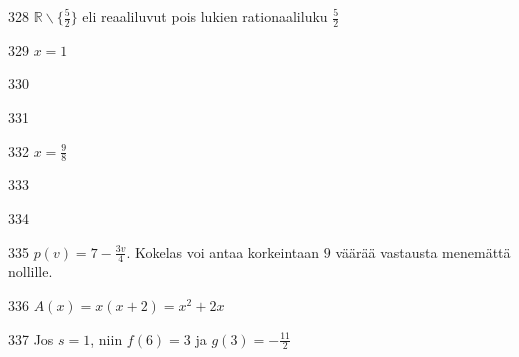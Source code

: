 \begin{Vastaus}{328}
   $\mathbb{R} \backslash \lbrace \frac{5}{2} \rbrace$ eli reaaliluvut pois lukien rationaaliluku $\frac{5}{2}$
  
\end{Vastaus}
\begin{Vastaus}{329}
    $x=1$
    
\end{Vastaus}
\begin{Vastaus}{330}
	 
\end{Vastaus}
\begin{Vastaus}{331}
  
\end{Vastaus}
\begin{Vastaus}{332}
$x=\frac{9}{8}$
  
\end{Vastaus}
\begin{Vastaus}{333}
  
\end{Vastaus}
\begin{Vastaus}{334}
	\alakohdatm{
	§ $\mathbb{R}$
	§ $\mathbb{R}$ $\setminus \lbrace 0 \rbrace$
	§ $\mathbb{R}_+$ (tai $\mathbb{R}_{\geq 0}$ tai $[0, \infty [$)
	§ $\mathbb{R}$
	}
	
\end{Vastaus}
\begin{Vastaus}{335}
		$p(v) = 7-\frac{3v}{4}$. Kokelas voi antaa korkeintaan $9$ väärää vastausta menemättä nollille.
	
\end{Vastaus}
\begin{Vastaus}{336}
    $A(x) = x(x+2)=x^2+2x$
  
\end{Vastaus}
\begin{Vastaus}{337}
   Jos $s=1$, niin $f(6) = 3$ ja $g(3) = -\frac{11}{2}$
  
\end{Vastaus}
